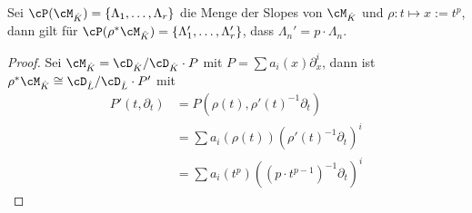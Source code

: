 %
\begin{lem}\label{lem:slope-pb-multiplikation}
\cite[5.4.3]{sabbah_cimpa90}
Sei $\cP(\cM_{\hat K})=\{\Lambda_1,\dots,\Lambda_r\}$ die Menge der Slopes von
$\cM_{\hat K}$ und $\rho:t\mapsto x:=t^p$, dann gilt für $\cP(\rho^*\cM_{\hat
K})=\{\Lambda_1',\dots,\Lambda_r'\}$, dass $\Lambda_n'=p\cdot\Lambda_n$.
\end{lem}
\begin{proof}
Sei $\cM_{\hat K}=\cD_{\hat K}\slash \cD_{\hat K}\cdot P$ mit $P=\sum
a_i(x)\partial_x^i$, dann ist
$\rho^*\cM_{\hat K}\cong\cD_{\hat L}\slash \cD_{\hat L}\cdot P'$ mit
\begin{align*}
P'(t,\partial_t) &=P(\rho(t),\rho'(t)^{-1}\partial_t)\\
                 &=\sum a_i(\rho(t))(\rho'(t)^{-1}\partial_t)^i\\
                 &=\sum a_i(t^p)((p\cdot t^{p-1})^{-1}\partial_t)^i
\end{align*}
\begin{comment}
TODO: Hier weiter...
\end{comment}
\end{proof}
%
